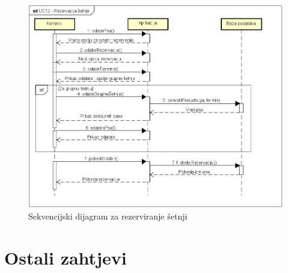 				\begin{figure}[H]
					\includegraphics[scale=0.7]{dijagrami/UC12-Rezervacija-setnje.PNG} 
					\centering
					\caption{Sekvencijski dijagram za rezerviranje šetnji}
					\label{fig:uc-1}
				\end{figure}
				
				\eject
				
				
				
		\section{Ostali zahtjevi}
		
